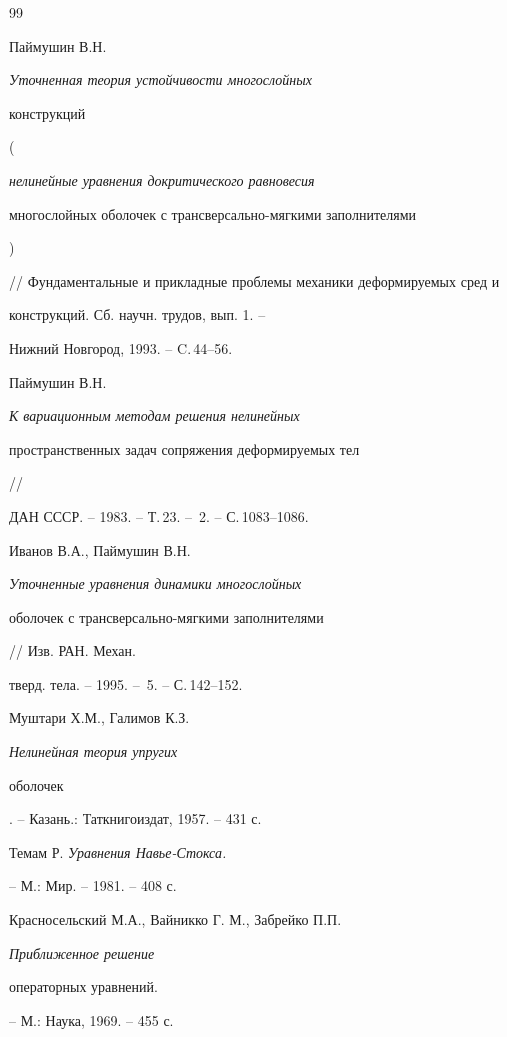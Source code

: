 \begin{thebibliography}{99}





 Паймушин В.Н. {\em Уточненная теория устойчивости многослойных


конструкций} ({\em нелинейные уравнения докритического равновесия


многослойных оболочек с трансверсально-мягкими заполнителями})


// Фундаментальные и прикладные проблемы механики деформируемых сред и


конструкций. Сб. научн. трудов, вып. 1. -- 


Нижний Новгород, 1993. -- C.\,44--56.





 Паймушин В.Н. {\em К вариационным методам решения нелинейных


пространственных задач сопряжения деформируемых тел} // 


ДАН СССР. -- 1983. -- Т.\,23. -- \No\,2. -- С.\,1083--1086.





 Иванов В.А., Паймушин В.Н.


{\em Уточненные уравнения динамики многослойных


оболочек с трансверсально-мягкими заполнителями} // Изв. РАН. Механ.


тверд. тела. -- 1995. -- \No\,5. -- С.\,142--152.





 Муштари Х.М., Галимов К.З. {\em Нелинейная теория упругих


оболочек}. -- Казань.: Таткнигоиздат, 1957. -- 431 с.





 Темам Р. {\em Уравнения Навье-Стокса.}


-- М.: Мир. -- 1981. -- 408 с.





 Красносельский М.А., Вайникко Г. М., Забрейко П.П.


{\em Приближенное решение


операторных уравнений.} -- М.: Наука, 1969. -- 455 с.






\end{thebibliography}
